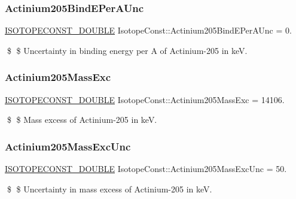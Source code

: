 \subsubsection{\texorpdfstring{Actinium205\+Bind\+E\+Per\+A\+Unc}{Actinium205BindEPerAUnc}}
{\footnotesize\ttfamily \mbox{\hyperlink{group___isotope_const-_macros_ga8f45a7272ce02c0b4c65c44636ed719a}{I\+S\+O\+T\+O\+P\+E\+C\+O\+N\+S\+T\+\_\+\+D\+O\+U\+B\+LE}} Isotope\+Const\+::\+Actinium205\+Bind\+E\+Per\+A\+Unc = 0.}

\$ \$ Uncertainty in binding energy per A of Actinium-\/205 in keV. \mbox{\label{group___isotope_const-_actinium-_ac205_gad5b1b4ea3aa266eec0920c8d05ba5283}} 
\subsubsection{\texorpdfstring{Actinium205\+Mass\+Exc}{Actinium205MassExc}}
{\footnotesize\ttfamily \mbox{\hyperlink{group___isotope_const-_macros_ga8f45a7272ce02c0b4c65c44636ed719a}{I\+S\+O\+T\+O\+P\+E\+C\+O\+N\+S\+T\+\_\+\+D\+O\+U\+B\+LE}} Isotope\+Const\+::\+Actinium205\+Mass\+Exc = 14106.}

\$ \$ Mass excess of Actinium-\/205 in keV. \mbox{\label{group___isotope_const-_actinium-_ac205_ga44d610eeabddb3d539a2736239585501}} 
\subsubsection{\texorpdfstring{Actinium205\+Mass\+Exc\+Unc}{Actinium205MassExcUnc}}
{\footnotesize\ttfamily \mbox{\hyperlink{group___isotope_const-_macros_ga8f45a7272ce02c0b4c65c44636ed719a}{I\+S\+O\+T\+O\+P\+E\+C\+O\+N\+S\+T\+\_\+\+D\+O\+U\+B\+LE}} Isotope\+Const\+::\+Actinium205\+Mass\+Exc\+Unc = 50.}

\$ \$ Uncertainty in mass excess of Actinium-\/205 in keV. \mbox{\label{group___isotope_const-_actinium-_ac205_ga923de79b2759e9ba5d0cea63893fb83b}} 
